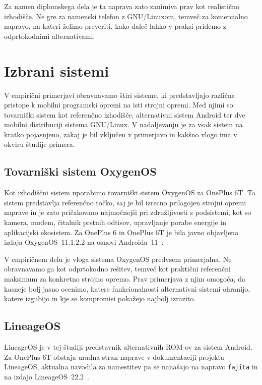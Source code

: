 \documentclass[a4paper,12pt,openright]{book}
\begin{document}
Za namen diplomskega dela je ta naprava zato zanimiva prav kot realistično izhodišče.
Ne gre za namenski telefon z GNU/Linuxom, temveč za komercialno napravo, na kateri želimo preveriti, kako daleč lahko v praksi pridemo z odprtokodnimi alternativami.

\section{Izbrani sistemi}
\label{sec:izbrani_sistemi_empiricni}

V empirični primerjavi obravnavamo štiri sisteme, ki predstavljajo različne pristope k mobilni programski opremi na isti strojni opremi.
Med njimi so tovarniški sistem kot referenčno izhodišče, alternativni sistem Android ter dve mobilni distribuciji sistema GNU/Linux.
V nadaljevanju je za vsak sistem na kratko pojasnjeno, zakaj je bil vključen v primerjavo in kakšno vlogo ima v okviru študije primera.

\subsection{Tovarniški sistem OxygenOS}
\label{sec:oxygenos_empiricni}

Kot izhodiščni sistem uporabimo tovarniški sistem OxygenOS za OnePlus 6T.
Ta sistem predstavlja referenčno točko, saj je bil izrecno prilagojen strojni opremi naprave in je zato pričakovano najmočnejši pri združljivosti s podsistemi, kot so kamera, modem, čitalnik prstnih odtisov, upravljanje porabe energije in aplikacijski ekosistem.
Za OnePlus 6 in OnePlus 6T je bila javno objavljena izdaja OxygenOS~11.1.2.2 na osnovi Androida~11~\cite{oneplus_oxygenos_11_1_2_2}.

V empiričnem delu je vloga sistema OxygenOS predvsem primerjalna.
Ne obravnavamo ga kot odprtokodno rešitev, temveč kot praktični referenčni maksimum za konkretno strojno opremo.
Prav primerjava z njim omogoča, da kasneje bolj jasno ocenimo, katere funkcionalnosti alternativni sistemi ohranijo, katere izgubijo in kje se kompromisi pokažejo najbolj izrazito.

\subsection{LineageOS}
\label{sec:lineageos_empiricni}

LineageOS je v tej študiji predstavnik alternativnih ROM-ov za sistem Android.
Za OnePlus 6T obstaja uradna stran naprave v dokumentaciji projekta LineageOS, aktualna navodila za namestitev pa se nanašajo na napravo \texttt{fajita} in na izdajo LineageOS~22.2~\cite{lineageos_fajita,lineageos_fajita_install}.
\end{document}
